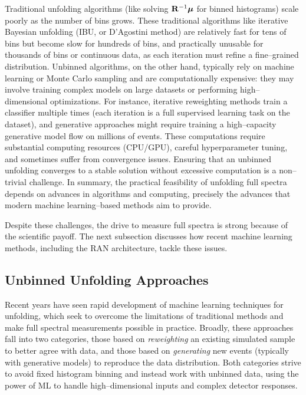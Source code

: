         Traditional unfolding algorithms (like solving $\mathbf{R}^{-1}\vb*{\mu}$ for binned histograms) scale poorly as the number of bins grows.
        These traditional algorithms like iterative Bayesian unfolding (IBU, or D’Agostini method) are relatively fast for tens of bins but become slow for hundreds of bins, and practically unusable for thousands of bins or continuous data, as each iteration must refine a fine--grained distribution.
        Unbinned algorithms, on the other hand, typically rely on machine learning or Monte Carlo sampling and are computationally expensive: they may involve training complex models on large datasets or performing high--dimensional optimizations.
        For instance, iterative reweighting methods train a classifier multiple times (each iteration is a full supervised learning task on the dataset), and generative approaches might require training a high--capacity generative model flow on millions of events.
        These computations require substantial computing resources (CPU/GPU), careful hyperparameter tuning, and sometimes suffer from convergence issues.
        Ensuring that an unbinned unfolding converges to a stable solution without excessive computation is a non--trivial challenge.
        In summary, the practical feasibility of unfolding full spectra depends on advances in algorithms and computing, precisely the advances that modern machine learning--based methods aim to provide.
        
        Despite these challenges, the drive to measure full spectra is strong because of the scientific payoff.
        The next subsection discusses how recent machine learning methods, including the RAN architecture, tackle these issues.

    \subsection{Unbinned Unfolding Approaches}
        Recent years have seen rapid development of machine learning techniques for unfolding, which seek to overcome the limitations of traditional methods and make full spectral measurements possible in practice.
        Broadly, these approaches fall into two categories, those based on \textit{reweighting} an existing simulated sample to better agree with data, and those based on \textit{generating} new events (typically with generative models) to reproduce the data distribution.
        Both categories strive to avoid fixed histogram binning and instead work with unbinned data, using the power of ML to handle high--dimensional inputs and complex detector responses.

